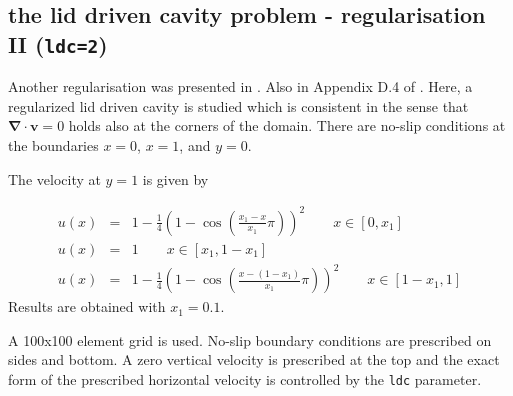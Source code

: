 \subsection*{the lid driven cavity problem - regularisation II ({\tt ldc=2})}

Another regularisation was presented in \cite{dejn16}. Also in Appendix D.4 of \cite{john16}. 
Here, a regularized lid driven cavity is studied which is consistent in the sense that 
${\bm \nabla}\cdot{\bm v}=0$ 
holds also at the corners of the domain.
There are no-slip conditions at the boundaries $x=0$, $x=1$, and $y=0$. 

The velocity at $y=1$ is given by

\begin{eqnarray}
u(x) &=& 1-\frac{1}{4}\left( 1-\cos (\frac{x_1-x}{x_1}\pi)  \right)^2   \quad\quad x\in[0,x_1] \nonumber\\
u(x) &=& 1 \quad\quad x\in[x_1,1-x_1] \nonumber\\
u(x) &=& 1-\frac{1}{4}\left( 1-\cos (\frac{x-(1-x_1)}{x_1}\pi)  \right)^2   \quad\quad x\in[1-x_1,1]
\end{eqnarray}
Results are obtained with $x_1=0.1$.




\newpage
A 100x100 element grid is used. No-slip boundary conditions are prescribed on sides and
bottom. A zero vertical velocity is prescribed at the top and the exact form of the 
prescribed horizontal velocity is controlled by the {\tt ldc} parameter.

